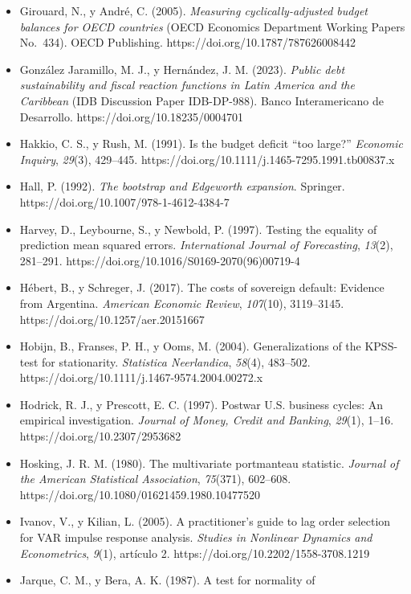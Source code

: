 \begin{itemize}[label={},leftmargin=1.27cm,itemindent=-1.27cm,itemsep=0.6\baselineskip]
\item
  Girouard, N., y André, C. (2005). \emph{Measuring cyclically-adjusted
  budget balances for OECD countries} (OECD Economics Department Working
  Papers No.~434). OECD Publishing. https://doi.org/10.1787/787626008442
\item
  González Jaramillo, M. J., y Hernández, J. M. (2023). \emph{Public
  debt sustainability and fiscal reaction functions in Latin America and
  the Caribbean} (IDB Discussion Paper IDB-DP-988). Banco Interamericano
  de Desarrollo. https://doi.org/10.18235/0004701
\item
  Hakkio, C. S., y Rush, M. (1991). Is the budget deficit ``too large?''
  \emph{Economic Inquiry}, \emph{29}(3), 429--445.
  https://doi.org/10.1111/j.1465-7295.1991.tb00837.x
\item
  Hall, P. (1992). \emph{The bootstrap and Edgeworth expansion}.
  Springer. https://doi.org/10.1007/978-1-4612-4384-7
\item
  Harvey, D., Leybourne, S., y Newbold, P. (1997). Testing the equality
  of prediction mean squared errors. \emph{International Journal of
  Forecasting}, \emph{13}(2), 281--291.
  https://doi.org/10.1016/S0169-2070(96)00719-4
\item
  Hébert, B., y Schreger, J. (2017). The costs of sovereign default:
  Evidence from Argentina. \emph{American Economic Review},
  \emph{107}(10), 3119--3145. https://doi.org/10.1257/aer.20151667
\item
  Hobijn, B., Franses, P. H., y Ooms, M. (2004). Generalizations of the
  KPSS-test for stationarity. \emph{Statistica Neerlandica},
  \emph{58}(4), 483--502.
  https://doi.org/10.1111/j.1467-9574.2004.00272.x
\item
  Hodrick, R. J., y Prescott, E. C. (1997). Postwar U.S. business
  cycles: An empirical investigation. \emph{Journal of Money, Credit and
  Banking}, \emph{29}(1), 1--16. https://doi.org/10.2307/2953682
\item
  Hosking, J. R. M. (1980). The multivariate portmanteau statistic.
  \emph{Journal of the American Statistical Association},
  \emph{75}(371), 602--608.
  https://doi.org/10.1080/01621459.1980.10477520
\item
  Ivanov, V., y Kilian, L. (2005). A practitioner's guide to lag order
  selection for VAR impulse response analysis. \emph{Studies in
  Nonlinear Dynamics and Econometrics}, \emph{9}(1), artículo 2.
  https://doi.org/10.2202/1558-3708.1219
\item
  Jarque, C. M., y Bera, A. K. (1987). A test for normality of

\end{itemize}
